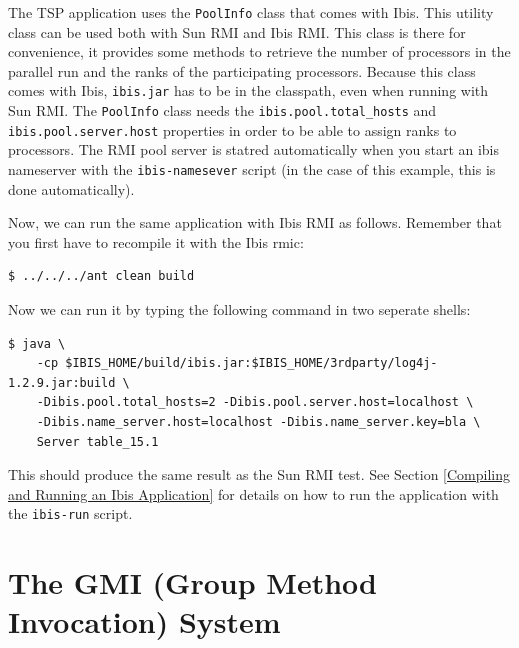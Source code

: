 \documentclass[10pt]{article}
\newcommand{\mysection}[1]{\section{#1}\label{#1}}
\begin{document}
The TSP application uses the \texttt{PoolInfo}
class that comes with Ibis. This utility class can be used both with
Sun RMI and Ibis RMI. This class is there for convenience, it provides
some methods to retrieve the number of processors in the parallel run
and the ranks of the participating processors. Because this class
comes with Ibis, \texttt{ibis.jar} has to be in the classpath, even
when running with Sun RMI.  The \texttt{PoolInfo} class needs the
\texttt{ibis.pool.total\_hosts} and \texttt{ibis.pool.server.host}
properties in order to be able to assign ranks to processors. The RMI
pool server is statred automatically when you start an ibis nameserver
with the \texttt{ibis-namesever} script (in the case of this example, this is done automatically).

Now, we can run the same application with Ibis RMI as follows.
Remember that you first have to recompile it with the Ibis rmic:
\begin{verbatim}
$ ../../../ant clean build
\end{verbatim}
\noindent
Now we can run it by typing the following command in two seperate shells:
\begin{verbatim}
$ java \
    -cp $IBIS_HOME/build/ibis.jar:$IBIS_HOME/3rdparty/log4j-1.2.9.jar:build \
    -Dibis.pool.total_hosts=2 -Dibis.pool.server.host=localhost \
    -Dibis.name_server.host=localhost -Dibis.name_server.key=bla \
    Server table_15.1 
\end{verbatim}
\noindent

This should produce the same result as the Sun RMI test.
See Section \ref{Compiling and Running an Ibis Application} for
details on how to run the application with the \texttt{ibis-run}
script.


\mysection{The GMI (Group Method Invocation) System}
\label{gmi-sec}
\end{document}

